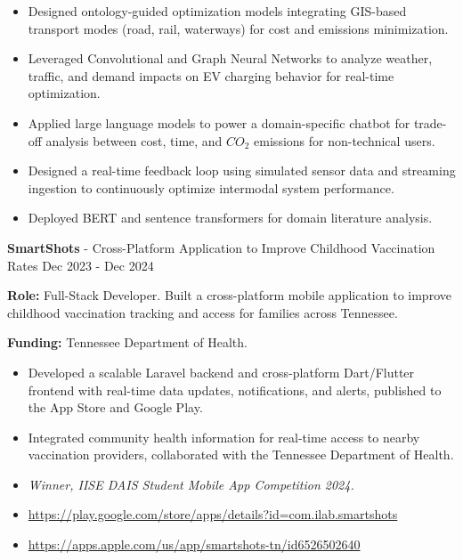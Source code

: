 \documentclass[10pt, letterpaper]{article}
\newenvironment{highlights}{
    \begin{itemize}[
        topsep=0.10 cm,
        parsep=0.10 cm,
        partopsep=0pt,
        itemsep=0pt,
        leftmargin=0 cm + 10pt
    ]
}{
    \end{itemize}
} %
\begin{document}
\begin{highlights}
    \item Designed ontology-guided optimization models integrating GIS-based transport modes (road, rail, waterways) for cost and emissions minimization.
    \item Leveraged Convolutional and Graph Neural Networks to analyze weather, traffic, and demand impacts on EV charging behavior for real-time optimization.
    \item Applied large language models to power a domain-specific chatbot for trade-off analysis between cost, time, and $CO_2$ emissions for non-technical users.
    \item Designed a real-time feedback loop using simulated sensor data and streaming ingestion to continuously optimize intermodal system performance.
    \item Deployed BERT and sentence transformers for domain literature analysis.
\end{highlights}

\vspace{0.3cm}
\noindent\textbf{SmartShots} - Cross-Platform Application to Improve Childhood Vaccination Rates \hfill Dec 2023 - Dec 2024

\noindent\textbf{Role:} Full-Stack Developer. Built a cross-platform mobile application to improve childhood vaccination tracking and access for families across Tennessee.

\noindent\textbf{Funding:} Tennessee Department of Health.

\begin{highlights}
    \item Developed a scalable Laravel backend and cross-platform Dart/Flutter frontend with real-time data updates, notifications, and alerts, published to the App Store and Google Play.
    \item Integrated community health information for real-time access to nearby vaccination providers, collaborated with the Tennessee Department of Health.
    \item \textit{Winner, IISE DAIS Student Mobile App Competition 2024.}
    \item \url{https://play.google.com/store/apps/details?id=com.ilab.smartshots}
    \item \url{https://apps.apple.com/us/app/smartshots-tn/id6526502640}
\end{highlights}
\end{document}
